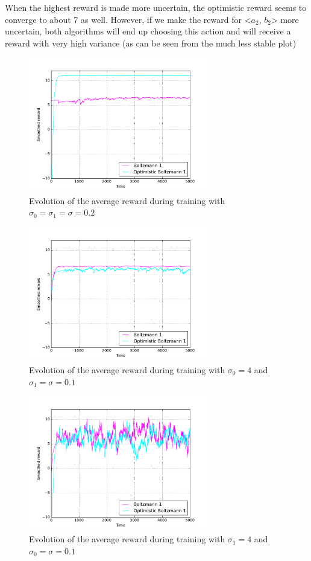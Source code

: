 \documentclass[a4paper]{article}
\begin{document}
When the highest reward is made more uncertain, the optimistic reward seems
to converge to about 7 as well. However, if we make the reward for 
<$a_2$, $b_2$> more uncertain, both algorithms will end up choosing this action
and will receive a reward with very high variance (as can be seen from the
much less stable plot)\\


\begin{figure}[H]
	\centering
	\includegraphics[width=0.7\textwidth]{./fig/ex2-0.pdf}
	\caption{Evolution of the average reward during training with 
		$\sigma_0 = \sigma_1 = \sigma = 0.2$}
	\label{ex31perf}
\end{figure}
\begin{figure}[H]
	\centering
	\includegraphics[width=0.7\textwidth]{./fig/ex2-1.pdf}
	\caption{Evolution of the average reward during training with
		$\sigma_0 = 4$ and $\sigma_1 = \sigma = 0.1$}
	\label{ex32perf}
\end{figure}
\begin{figure}[H]
	\centering
	\includegraphics[width=0.7\textwidth]{./fig/ex2-2.pdf}
	\caption{Evolution of the average reward during training with
		$\sigma_1 = 4$ and  $\sigma_0 = \sigma = 0.1$}
	\label{ex33perf}
\end{figure}
\end{document}

